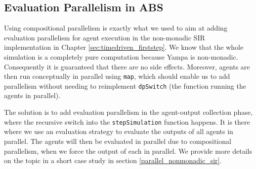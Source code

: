 \subsection{Evaluation Parallelism in ABS}
Using compositional parallelism is exactly what we used to aim at adding evaluation parallelism for agent execution in the non-monadic SIR implementation in Chapter \ref{sec:timedriven_firststep}. We know that the whole simulation is a completely pure computation because Yampa is non-monadic. Consequently it is guaranteed that there are no side effects. Moreover, agents are then run conceptually in parallel using \texttt{map}, which should enable us to add parallelism without needing to reimplement \texttt{dpSwitch} (the function running the agents in parallel). %

The solution is to add evaluation parallelism in the agent-output collection phase, where the recursive switch into the \texttt{stepSimulation} function happens. It is there where we use an evaluation strategy to evaluate the outputs of all agents in parallel. The agents will then be evaluated in parallel due to compositional parallelism, when we force the output of each in parallel. We provide more details on the topic in a short case study in section \ref{parallel_nonmonadic_sir}.
